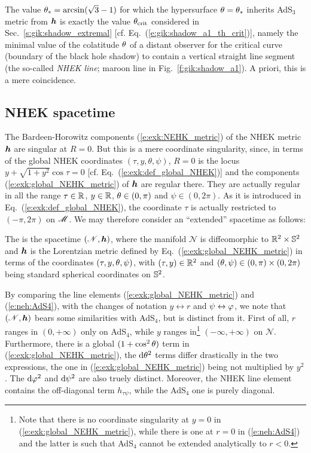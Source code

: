 \begin{remark}
The value $\theta_* = \arcsin(\sqrt{3} - 1)$ for which the hypersurface
$\theta = \theta_*$ inherits AdS$_3$ metric from $\bm{h}$ is exactly
the value $\theta_{\rm crit}$ considered in Sec.~\ref{s:gik:shadow_extremal}
[cf. Eq.~(\ref{e:gik:shadow_a1_th_crit})], namely
the minimal value of the colatitude $\theta$ of a distant observer
for the critical curve
(boundary of the black hole shadow) to contain a vertical straight line segment
(the so-called \emph{NHEK line}; maroon line in Fig.~\ref{f:gik:shadow_a1}).
A priori, this is a mere coincidence.
\end{remark}



\subsection{NHEK spacetime} \label{s:exk:NHEK_spacetime}

The Bardeen-Horowitz components (\ref{e:exk:NEHK_metric}) of the NHEK metric $\bm{h}$
are singular at $R=0$. But this is a mere coordinate singularity, since,
in terms of the global NHEK coordinates
$(\tau,y,\theta,\psi)$, $R=0$ is the locus $y + \sqrt{1 + y^2}\cos\tau = 0$
[cf. Eq.~(\ref{e:exk:def_global_NHEK})] and
the components (\ref{e:exk:global_NEHK_metric})
of $\bm{h}$ are regular there.
They are actually regular in all the range $\tau\in\mathbb{R}$, $y\in\mathbb{R}$, $\theta\in(0,\pi)$
and $\psi\in(0,2\pi)$.
As it is introduced in Eq.~(\ref{e:exk:def_global_NHEK}),
the coordinate $\tau$ is actually restricted to $(-\pi, 2\pi)$ on $\mathscr{M}$. We may therefore
consider an ``extended'' spacetime as follows:
\begin{greybox}
The  is the spacetime $(\mathscr{N},\bm{h})$, where
the manifold $\mathscr{N}$ is diffeomorphic to $\mathbb{R}^2\times \mathbb{S}^2$ and $\bm{h}$ is the
Lorentzian metric defined by Eq.~(\ref{e:exk:global_NEHK_metric}) in terms
of the coordinates $(\tau,y,\theta,\psi)$, with $(\tau,y)\in \mathbb{R}^2$ and
$(\theta,\psi)\in(0,\pi)\times(0,2\pi)$ being standard spherical coordinates on $\mathbb{S}^2$.
\end{greybox}
By comparing the line elements (\ref{e:exk:global_NEHK_metric}) and
(\ref{e:neh:AdS4}), with the changes of notation $y\leftrightarrow r$
and $\psi\leftrightarrow \varphi$, we note that
$(\mathscr{N},\bm{h})$ bears some similarities with AdS$_4$, but is
distinct from it. First of all, $r$ ranges in $(0, +\infty)$ only
on AdS$_4$, while $y$ ranges in\footnote{Note that there
is no coordinate singularity at $y=0$ in (\ref{e:exk:global_NEHK_metric}), while
there is one at $r=0$ in (\ref{e:neh:AdS4}) and the latter is such that AdS$_4$ cannot
be extended analytically to $r<0$.} $(-\infty, +\infty)$ on $\mathscr{N}$.
Furthermore, there is a global $(1 + \cos^2\theta)$ term in (\ref{e:exk:global_NEHK_metric}),
the $\mathrm{d}\theta^2$ terms differ drastically in the two expressions, the one in
(\ref{e:exk:global_NEHK_metric}) being not multiplied by $y^2$.
The $\mathrm{d}\varphi^2$ and $\mathrm{d}\psi^2$ are also truely distinct. Moreover, the NHEK line element
contains the off-diagonal term $h_{\tau\psi}$, while
the AdS$_4$ one is purely diagonal.

